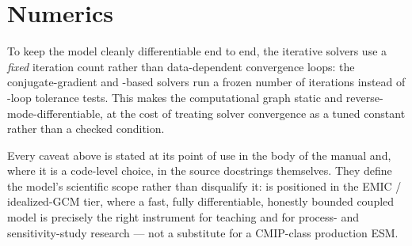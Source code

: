 \section{Numerics}\label{sec:appE_numerics}

To keep the model cleanly differentiable end to end, the iterative solvers use a
\emph{fixed} iteration count rather than data-dependent convergence loops: the
conjugate-gradient and -based solvers run a frozen number of
iterations instead of -loop tolerance tests. This makes the
computational graph static and reverse-mode-differentiable, at the cost of treating
solver convergence as a tuned constant rather than a checked condition.


\begin{remark}
Every caveat above is stated at its point of use in the body of the manual and,
where it is a code-level choice, in the source docstrings themselves. They define
the model's scientific scope rather than disqualify it: \model{} is positioned in
the EMIC / idealized-GCM tier, where a fast, fully differentiable, honestly
bounded coupled model is precisely the right instrument for teaching and for
process- and sensitivity-study research --- not a substitute for a CMIP-class
production ESM.
\end{remark}

